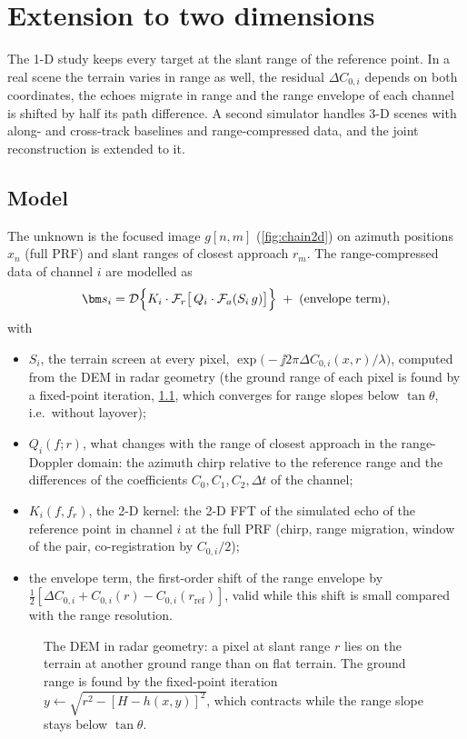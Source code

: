\chapter{Extension to two dimensions}\label{ch:joint2d}

The 1-D study keeps every target at the slant range of the reference point. In a real scene the terrain varies in range as
well, the residual $\Delta C_{0,i}$ depends on both coordinates, the echoes migrate in range and the range envelope of each channel is
shifted by half its path difference. A second simulator handles 3-D scenes with along- and cross-track baselines and
range-compressed data, and the joint reconstruction is extended to it.

\section{Model}

The unknown is the focused image $g[n,m]$ (\cref{fig:chain2d}) on azimuth positions $x_n$ (full PRF) and slant ranges of closest approach $r_m$.
The range-compressed data of channel $i$ are modelled as
\begin{equation}
  \bm s_i = \mathcal D\Bigl\{ K_i \cdot \mathcal F_r\bigl[\, Q_i \cdot \mathcal F_a( S_i\, g )\bigr] \Bigr\}
  \;+\; \text{(envelope term)},
\end{equation}
with
\begin{itemize}
  \item $S_i$, the terrain screen at every pixel, $\exp\bigl(-\jj 2\pi\Delta C_{0,i}(x,r)/\lambda\bigr)$, computed from the DEM in radar
        geometry (the ground range of each pixel is found by a fixed-point iteration, \cref{fig:demradar}, which converges for
        range slopes below $\tan\theta$, i.e.\ without layover);
  \item $Q_i(f;r)$, what changes with the range of closest approach in the range-Doppler domain: the azimuth chirp relative
        to the reference range and the differences of the coefficients $C_0,C_1,C_2,\Delta t$ of the channel;
  \item $K_i(f,f_r)$, the 2-D kernel: the 2-D FFT of the simulated echo of the reference point in channel $i$ at the full PRF
        (chirp, range migration, window of the pair, co-registration by $C_{0,i}/2$);
  \item the envelope term, the first-order shift of the range envelope by $\frac12[\Delta C_{0,i} + C_{0,i}(r)-C_{0,i}(r_\mathrm{ref})]$,
        valid while this shift is small compared with the range resolution.
\end{itemize}
\begin{figure}[htbp]
\centering

\caption[The DEM in radar geometry]{The DEM in radar geometry: a pixel at slant range $r$ lies on the terrain at another ground
range than on flat terrain. The ground range is found by the fixed-point iteration $y\leftarrow\sqrt{r^2-[H-h(x,y)]^2}$, which
contracts while the range slope stays below $\tan\theta$.}
\label{fig:demradar}
\end{figure}


